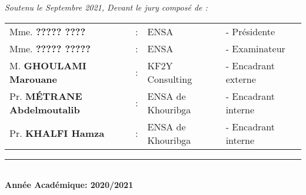 \begin{titlepage}
\vfill
\centering
{\large \textit{Soutenu le Septembre 2021, Devant le jury composé de : }}\\[0.5cm]
\begin{tabular}{llll}
\large Mme. \textbf{????? \textsc{????}}     & : & \large ENSA & \large - Présidente \\[0.1cm]
\large Mme. \textbf{????? \textsc{?????}}    & : & \large ENSA & \large - Examinateur \\[0.1cm]
\large M. \textbf{\textsc{GHOULAMI} Marouane}    & : & \large KF2Y Consulting & \large - Encadrant externe \\[0.1cm]
\large Pr. \textbf{\textsc{MÉTRANE} Abdelmoutalib}         & : & \large ENSA de Khouribga & \large - Encadrant interne \\[0.1cm]
\large Pr. \textbf{\textsc{KHALFI} Hamza}         & : & \large ENSA de Khouribga & \large - Encadrant interne
\end{tabular}

\vfill
\rule{0.95\textwidth}{2pt}\\
{\large \textbf{Année Académique: 2020/2021}}

\end{titlepage}
